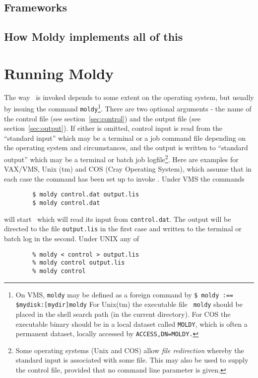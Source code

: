 \section{Frameworks}
\label{sec:frameworks}
\section{How Moldy implements all of this}

\chapter{Running Moldy}

The way \moldy\  is invoked depends to some extent on the operating
system, but usually by issuing the command \verb'moldy'\footnote{On
VMS, {\tt moldy} may be defined as a foreign command by {\tt \$ moldy
:== \$mydisk:[mydir]moldy} For Unix(tm) the executable file {\tt
moldy} should be placed in the shell search path (\eg in the current
directory). For COS the executable binary should be in a local dataset
called {\tt MOLDY}, which is often a permanent dataset, locally
accessed by {\tt ACCESS,DN=MOLDY.}}.  There are two optional arguments
- the name of the control file (see section~\ref{sec:control}) and the
output file (see section~\ref{sec:output}).  If either is omitted,
control input is read from the ``standard input'' which may be a
terminal or a job command file depending on the operating system and
circumstances, and the output is written to ``standard output'' which
may be a terminal or batch job logfile\footnote{Some operating systems
(Unix and COS) allow {\em file redirection} whereby the standard input
is associated with some file.  This may also be used to supply the
control file, provided that no command line parameter is given.}.
Here are examples for VAX/VMS, Unix (tm) and COS (Cray Operating
System), which assume that in each case the command has been set up to
invoke \moldy. Under VMS the commands
\begin{verbatim}
        $ moldy control.dat output.lis
        $ moldy control.dat
\end{verbatim}
will start \moldy\  which will read its input from \verb'control.dat'.
The output will be directed to the file \verb'output.lis' in the first
case and written to the terminal or batch log in the second.  Under
UNIX any of
\begin{verbatim}
        % moldy < control > output.lis
        % moldy control output.lis
        % moldy control
\end{verbatim}
